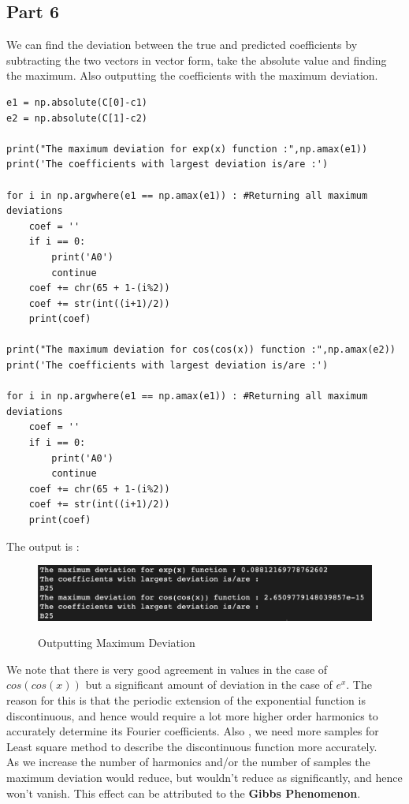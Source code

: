 \documentclass[11pt, a4paper]{article}
\begin{document}
\subsection{Part 6}
We can find the deviation between the true and predicted coefficients by subtracting the two vectors in vector form, take the absolute value and finding the maximum. Also outputting the coefficients with the maximum deviation.
\begin{verbatim}
e1 = np.absolute(C[0]-c1)
e2 = np.absolute(C[1]-c2)

print("The maximum deviation for exp(x) function :",np.amax(e1))
print('The coefficients with largest deviation is/are :')

for i in np.argwhere(e1 == np.amax(e1)) : #Returning all maximum deviations
	coef = ''
	if i == 0:
		print('A0')
		continue
	coef += chr(65 + 1-(i%2))
	coef += str(int((i+1)/2))
	print(coef)

print("The maximum deviation for cos(cos(x)) function :",np.amax(e2))
print('The coefficients with largest deviation is/are :')

for i in np.argwhere(e1 == np.amax(e1)) : #Returning all maximum deviations
	coef = ''
	if i == 0:
		print('A0')
		continue
	coef += chr(65 + 1-(i%2))
	coef += str(int((i+1)/2))
	print(coef)
\end{verbatim}
The output is :
\begin{figure}[H]
   	\centering
   	\includegraphics[scale=0.5]{out.png}
   	\label{fig:out}
   	\caption{Outputting Maximum Deviation}
\end{figure}
{We note that there is very good agreement in values in the case of $cos(cos(x))$ but a significant amount of deviation in the case of $e^{x}$. The reason for this is that the periodic extension of the exponential function is discontinuous, and hence would require a lot more higher order harmonics to accurately determine its Fourier coefficients. Also , we need more samples for Least square method to describe the discontinuous function more accurately.
\\
As we increase the number of harmonics and/or the number of samples the maximum deviation would reduce, but wouldn't reduce as significantly, and hence won't vanish.
This effect can be attributed to the \textbf{Gibbs Phenomenon}.
}
\end{document}
